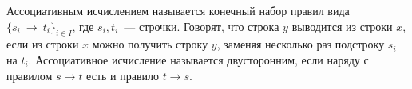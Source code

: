 Ассоциативным исчислением называется конечный набор правил вида $\{s_i~\to~t_i\}_{i \in I}$, где $s_i, t_i$~--- строчки. Говорят,
что строка $y$ выводится из строки $x$, если из строки $x$ можно получить строку $y$, заменяя несколько раз подстроку $s_i$ на
$t_i$. Ассоциативное исчисление называется двусторонним, если наряду с правилом $s \to t$ есть и правило $t \to s$.